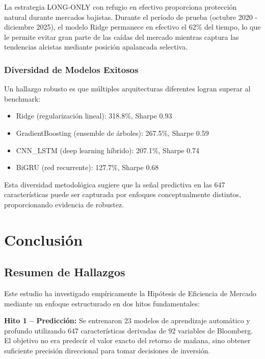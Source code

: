 \documentclass[11pt,a4paper]{article}
\begin{document}
La estrategia LONG-ONLY con refugio en efectivo proporciona protección natural durante mercados bajistas. Durante el período de prueba (octubre 2020 - diciembre 2025), el modelo Ridge permanece en efectivo el 62\% del tiempo, lo que le permite evitar gran parte de las caídas del mercado mientras captura las tendencias alcistas mediante posición apalancada selectiva.

\subsubsection{Diversidad de Modelos Exitosos}

Un hallazgo robusto es que múltiples arquitecturas diferentes logran superar al benchmark:
\begin{itemize}[noitemsep]
    \item Ridge (regularización lineal): 318.8\%, Sharpe 0.93
    \item GradientBoosting (ensemble de árboles): 267.5\%, Sharpe 0.59
    \item CNN\_LSTM (deep learning híbrido): 207.1\%, Sharpe 0.74
    \item BiGRU (red recurrente): 127.7\%, Sharpe 0.68
\end{itemize}

Esta diversidad metodológica sugiere que la señal predictiva en las 647 características puede ser capturada por enfoques conceptualmente distintos, proporcionando evidencia de robustez.

\section{Conclusión}

\subsection{Resumen de Hallazgos}

Este estudio ha investigado empíricamente la Hipótesis de Eficiencia de Mercado mediante un enfoque estructurado en dos hitos fundamentales:

\textbf{Hito 1 -- Predicción:} Se entrenaron 23 modelos de aprendizaje automático y profundo utilizando 647 características derivadas de 92 variables de Bloomberg. El objetivo no era predecir el valor exacto del retorno de mañana, sino obtener suficiente precisión direccional para tomar decisiones de inversión.
\end{document}
